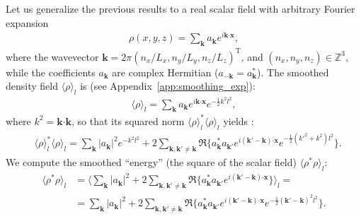\documentclass[]{article}
\newcommand{\mathcolorbox}[2]{\colorbox{#1}{$\displaystyle #2$}}
\newcommand{\bcdot}{\bm{\cdot}}
\begin{document}
Let us generalize the previous results to a real scalar field with arbitrary Fourier expansion
%
\begin{align}
	\rho (x,y,z) = \sum_{\bm k} a_{\bm k} e^{i \bm k \bcdot\bm x }  ,
\end{align}
%
where the wavevector $\bm k = 2 \pi \left(n_x/L_x, n_y/L_y, n_z/L_z \right)^\mathrm{T}$, and $\left(n_x, n_y, n_z \right) \in \mathbb{Z}^3$, while the coefficients $a_{\bm k}$ are complex Hermitian ($a_{-\bm k} = a_{\bm k}^*$). 
The smoothed density field $\langle \rho \rangle_l$ is (see Appendix~\ref{app:smoothing_exp}):
%
\begin{align}
	\langle \rho \rangle_l = \sum_{\bm k} a_{\bm k} e^{i \bm k \bcdot\bm x } e^{-\frac{1}{2} k^2 l^2}   ,
\end{align}
%
where $k^2 = \bm k \bcdot\bm k$, so that its squared norm $\langle \rho \rangle_l^* \langle \rho \rangle_l$ yields :
%
\begin{align}
	&\langle \rho \rangle_l^* \langle \rho \rangle_l  = \sum_{\bm k} |a_{\bm k}|^2 e^{- k^2 l^2} + 2 \sum_{\bm k, \bm k' \neq \bm k} \Re \lbrace a_{\bm k}^* a_{\bm k'} e^{i (\bm k' - \bm k) \bcdot\bm x } e^{-\frac{1}{2} (k'^2 + k^2) l^2} \rbrace.
\end{align}
%
We compute the smoothed ``energy'' (the square of the scalar field) $\langle \rho^* \rho \rangle_l$:
%
\begin{align}
	\langle \rho^* \rho \rangle_l &= \langle \sum_{\bm k} |a_{\bm k}|^2  + 2 \sum_{\bm k, \bm k' \neq \bm k} \Re \lbrace a_{\bm k}^* a_{\bm k'} e^{i (\bm k' - \bm k) \bcdot\bm x } \rbrace  \rangle_l = \nonumber \\
	&= \sum_{\bm k} |a_{\bm k}|^2 + 2 \sum_{\bm k, \bm k' \neq \bm k} \Re \lbrace a_{\bm k}^* a_{\bm k'} e^{i (\bm k' - \bm k) \bcdot\bm x } e^{-\frac{1}{2} (\bm k' - \bm k)^2 l^2} \rbrace.
\end{align}
%
\end{document}
